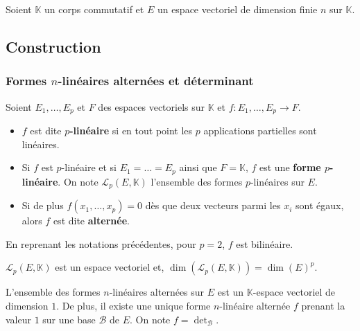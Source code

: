 



  Soient $\mathbb{K}$ un corps commutatif et $E$ un espace vectoriel de dimension finie $n$ sur $\mathbb{K}$.

  \subsection{Construction}

  \subsubsection{Formes \texorpdfstring{$n$}{n}-linéaires alternées et déterminant}


  \begin{definition}
    Soient $E_1, \dots, E_p$ et $F$ des espaces vectoriels sur $\mathbb{K}$ et $f : E_1, \dots, E_p \rightarrow F$.
    \begin{itemize}
      \item $f$ est dite \textbf{$p$-linéaire} si en tout point les $p$ applications partielles sont linéaires.
      \item Si $f$ est $p$-linéaire et si $E_1 = \dots = E_p$ ainsi que $F = \mathbb{K}$, $f$ est une \textbf{forme $p$-linéaire}. On note $\mathcal{L}_p(E, \mathbb{K})$ l'ensemble des formes $p$-linéaires sur $E$.
      \item Si de plus $f(x_1, \dots, x_p) = 0$ dès que deux vecteurs parmi les $x_i$ sont égaux, alors $f$ est dite \textbf{alternée}.
    \end{itemize}
  \end{definition}

  \begin{example}
    En reprenant les notations précédentes, pour $p = 2$, $f$ est bilinéaire.
  \end{example}

  \begin{proposition}
    $\mathcal{L}_p(E, \mathbb{K})$ est un espace vectoriel et, $\operatorname{dim}(\mathcal{L}_p(E, \mathbb{K})) = \operatorname{dim}(E)^p$.
  \end{proposition}

  \begin{theorem}
    L'ensemble des formes $n$-linéaires alternées sur $E$ est un $\mathbb{K}$-espace vectoriel de dimension $1$. De plus, il existe une unique forme $n$-linéaire alternée $f$ prenant la valeur $1$ sur une base $\mathcal{B}$ de $E$. On note $f = \det_{\mathcal{B}}$.
  \end{theorem}


